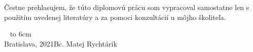 \documentclass[12pt, a4paper, oneside]{book}
\newcommand\mfauthor{Bc. Matej Rychtárik}
\newcommand\mfplacedate{Bratislava, 2021}
\begin{document}
\thispagestyle{empty}


\begin{figure}[H]
\begin{center}
\label{img:zadanie}
\end{center}
\end{figure}

{~}\vspace{12cm}

\noindent
\begin{minipage}{0.25\textwidth}~\end{minipage}
\begin{minipage}{0.75\textwidth}
Čestne prehlasujem, že túto diplomovú prácu som vypracoval samostatne len s použitím uvedenej literatúry a za pomoci konzultácií u môjho školiteľa.
\newline \newline
\end{minipage}
\vfill
~ \hfill {\hbox to 6cm{\dotfill}} \\
\mfplacedate \hfill \mfauthor
\vfill\eject 
\end{document}
